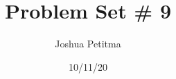 \documentclass[11pt]{article}
\title{Problem Set \# 9}
\author{Joshua Petitma}
\date{10/11/20}
\begin{document}
    \maketitle
    \section[Question 1]{}
    \subsection[1a]{}
\end{document}
